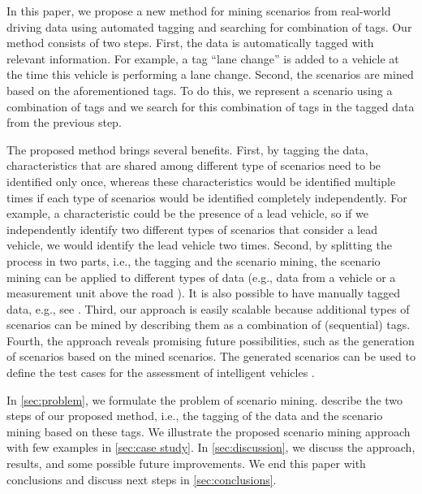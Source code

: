 In this paper, we propose a new method for mining scenarios from real-world driving data using automated tagging and searching for combination of tags. 
Our method consists of two steps. 
First, the data is automatically tagged with relevant information. For example, a tag ``lane change'' is added to a vehicle at the time this vehicle is performing a lane change. 
Second, the scenarios are mined based on the aforementioned tags. \cenda
\cstartd To do this, we represent a scenario using a combination of tags and we search for this combination of tags in the tagged data from the previous step. \cendd

\cstarta The proposed method brings several benefits. 
First, by tagging the data, characteristics that are shared among different type of scenarios need to be identified only once, whereas these characteristics would be identified multiple times if each type of scenarios would be identified completely independently. \cenda
\cstartf For example, a characteristic could be the presence of a lead vehicle, so if we independently identify two different types of scenarios that consider a lead vehicle, we would identify the lead vehicle two times. \cendf
\cstarta Second, by splitting the process in two parts, i.e., the tagging and the scenario mining, the scenario mining can be applied to different types of data (e.g., data from a vehicle \autocite{paardekooper2019dataset6000km} or a measurement unit above the road \autocite{kovvali2007video,krajewski2018highD}). 
It is also possible to have manually tagged data, e.g., see \autocite{fontana2018action}. 
Third, our approach is easily scalable because additional types of scenarios can be mined by  describing them as a combination of (sequential) tags. \cenda
\cstartf Fourth, the approach reveals promising future possibilities, such as the generation of scenarios based on the mined scenarios. \cendf
\cstartg The generated scenarios can be used to define the test cases for the assessment of intelligent vehicles \autocite{elrofai2018scenario, putz2017pegasus, roesener2016scenariobased, deGelder2017assessment, stellet2015taxonomy, zhao2018evaluation}. \cendg

\cstarta In \cref{sec:problem}, we formulate the problem of scenario mining.  describe the two steps of our proposed method, i.e., the tagging of the data and the scenario mining based on these tags. 
We illustrate the proposed scenario mining approach with few examples in \cref{sec:case study}. \cenda
\cstartf In \cref{sec:discussion}, we discuss the approach, results, and some possible future improvements. \cendf
We end this paper with conclusions and discuss next steps in \cref{sec:conclusions}. \cenda
